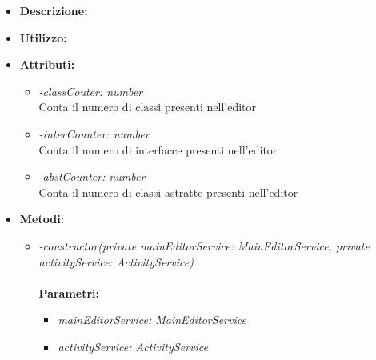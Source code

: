 \begin{itemize}
	\item \textbf{Descrizione:}\\
	
	\item \textbf{Utilizzo:}\\
	
	\item \textbf{Attributi:}
		\begin{itemize}
			\item \emph{-classCouter: number}\\
			Conta il numero di classi presenti nell'editor
			\item \emph{-interCounter: number}\\
			Conta il numero di interfacce presenti nell'editor
			\item \emph{-abstCounter: number}\\
			Conta il numero di classi astratte presenti nell'editor
		\end{itemize}
	\item \textbf{Metodi:}
		\begin{itemize}
			\item \emph{-constructor(private mainEditorService: MainEditorService, private activityService: ActivityService)}\\
    		\\
    		\textbf{Parametri:}
    		\begin{itemize}
    			\item \emph{mainEditorService: MainEditorService}\\
    			
    			\item \emph{activityService: ActivityService}\\
    			

\end{itemize}
\end{itemize}
\end{itemize}
